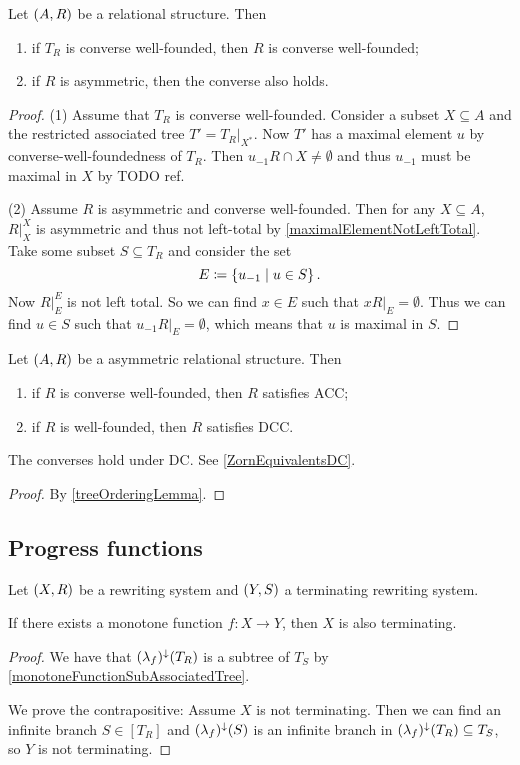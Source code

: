 \begin{proposition}
Let $\left( A, R \right)$ be a relational structure. Then
\begin{enumerate}
\item if $T_R$ is converse well-founded, then $R$ is converse well-founded;
\item if $R$ is asymmetric, then the converse also holds.
\end{enumerate}
\end{proposition}
\begin{proof}
(1) Assume that $T_R$ is converse well-founded. Consider a subset $X\subseteq A$ and the restricted associated tree $T' = T_R|_{X^*}$. Now $T'$ has a maximal element $u$ by converse-well-foundedness of $T_R$. Then $u_{-1}R\cap X \neq \emptyset$ and thus $u_{-1}$ must be maximal in $X$ by TODO ref.

(2) Assume $R$ is asymmetric and converse well-founded. Then for any $X\subseteq A$, $R|_X^{X}$ is asymmetric and thus not left-total by \ref{maximalElementNotLeftTotal}. Take some subset $S\subseteq T_R$ and consider the set
\[ E \coloneqq \left\{ u_{-1} \;\middle|\; u\in S \right\}. \]
Now $R|_E^E$ is not left total. So we can find $x\in E$ such that $xR|_E = \emptyset$. Thus we can find $u\in S$ such that $u_{-1}R|_E = \emptyset$, which means that $u$ is maximal in $S$.
\end{proof}
\begin{corollary} \label{welfoundedACC}
Let $\left( A, R \right)$ be a asymmetric relational structure. Then
\begin{enumerate}
\item if $R$ is converse well-founded, then $R$ satisfies ACC;
\item if $R$ is well-founded, then $R$ satisfies DCC.
\end{enumerate}
The converses hold under DC. See \ref{ZornEquivalentsDC}.
\end{corollary}
\begin{proof}
By \ref{treeOrderingLemma}.
\end{proof}


\subsection{Progress functions}
\begin{proposition} \label{rewritingSystemProgressFunction}
Let $\left( X, R \right)$ be a rewriting system and $\left( Y,S \right)$ a terminating rewriting system.

If there exists a monotone function $f: X \to Y$, then $X$ is also terminating.
\end{proposition}
\begin{proof}
We have that $(\lambda_f)^\downarrow(T_R)$ is a subtree of $T_S$ by \ref{monotoneFunctionSubAssociatedTree}.

We prove the contrapositive: Assume $X$ is not terminating. Then we can find an infinite branch $S\in [T_R]$ and $(\lambda_f)^\downarrow(S)$ is an infinite branch in $(\lambda_f)^\downarrow(T_R) \subseteq T_S$, so $Y$ is not terminating.
\end{proof}

